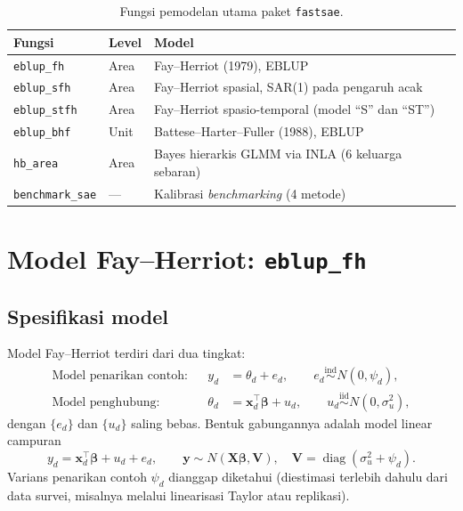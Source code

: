 \documentclass[11pt,a4paper]{article}
\theoremstyle{definition}
\begin{document}
\begin{table}[h]
\centering
\caption{Fungsi pemodelan utama paket \texttt{fastsae}.}
\label{tab:fungsi}
\begin{tabular}{@{}lll@{}}
\toprule
Fungsi & Level & Model \\
\midrule
\texttt{eblup\_fh}   & Area & Fay--Herriot (1979), EBLUP \\
\texttt{eblup\_sfh}  & Area & Fay--Herriot spasial, SAR(1) pada pengaruh acak \\
\texttt{eblup\_stfh} & Area & Fay--Herriot spasio-temporal (model ``S'' dan ``ST'') \\
\texttt{eblup\_bhf}  & Unit & Battese--Harter--Fuller (1988), EBLUP \\
\texttt{hb\_area}    & Area & Bayes hierarkis GLMM via INLA (6 keluarga sebaran) \\
\texttt{benchmark\_sae} & --- & Kalibrasi \emph{benchmarking} (4 metode) \\
\bottomrule
\end{tabular}
\end{table}

\section{Model Fay--Herriot: \texttt{eblup\_fh}}

\subsection{Spesifikasi model}

Model Fay--Herriot \cite{fay1979} terdiri dari dua tingkat:
\begin{subequations}
\begin{align}
  \text{Model penarikan contoh:} && y_d &= \theta_d + e_d,
      \qquad e_d \overset{\text{ind}}{\sim} N(0, \psi_d), \label{eq:fh-sampling} \\
  \text{Model penghubung:} && \theta_d &= \mathbf{x}_d^{\top}\boldsymbol{\beta} + u_d,
      \qquad u_d \overset{\text{iid}}{\sim} N(0, \sigma_u^2), \label{eq:fh-linking}
\end{align}
\end{subequations}
dengan $\{e_d\}$ dan $\{u_d\}$ saling bebas. Bentuk gabungannya adalah model linear campuran
\begin{equation}
  y_d = \mathbf{x}_d^{\top}\boldsymbol{\beta} + u_d + e_d,
  \qquad
  \mathbf{y} \sim N(\mathbf{X}\boldsymbol{\beta}, \mathbf{V}), \quad
  \mathbf{V} = \operatorname{diag}(\sigma_u^2 + \psi_d).
  \label{eq:fh-combined}
\end{equation}
Varians penarikan contoh $\psi_d$ dianggap diketahui (diestimasi terlebih dahulu dari
data survei, misalnya melalui linearisasi Taylor atau replikasi).
\end{document}
